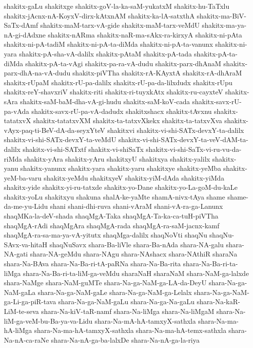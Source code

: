 {shakitx-gaLu
shakitxge
shakitx-goV-la-ka-saM-yukatxM
shakitx-hu-TaTxlu
shakitx-jAcnx-nA-KoyxV-dirx-kAtxnAM
shakitx-ka-lA-satxthA
shakitx-ma-BiV-SaTx-dAmf
shakitx-maM-tarx-vA-gide
shakitx-maM-tarx-veMdU
shakitx-ma-ya-nA-gi-dAdxne
shakitx-nARma
shakitx-naR-ma-sAkx-ra-kirxyA
shakitx-ni-pAta
shakitx-ni-pA-tadiM
shakitx-ni-pA-ta-diMda
shakitx-ni-pA-ta-vanunx
shakitx-ni-yara
shakitx-pA-sha-vA-dalilx
shakitx-pAtaM
shakitx-pA-tada
shakitx-pA-ta-diMda
shakitx-pA-ta-vAgi
shakitx-pa-ra-vA-dudu
shakitx-parx-dhAnaM
shakitx-parx-dhA-na-vA-dudu
shakitx-piVTha
shakitx-rA-KAyxtA
shakitx-rA-dhAraM
shakitx-rUpaM
shakitx-rU-pa-dalilx
shakitx-rU-pa-da-lilxdudx
shakitx-rUpu
shakitx-reY-shavxriV
shakitx-riti
shakitx-ri-tuyxkAtx
shakitx-ru-cayxteV
shakitx-sAra
shakitx-saM-baM-dha-vA-gi-hudu
shakitx-saM-koV-cada
shakitx-savx-rU-pa-vAda
shakitx-savx-rU-pa-vA-dadudx
shakitxshacx
shakitx-tAvxnu
shakitx-tatatxvX
shakitx-tatatxvXM
shakitx-ta-tatxvXkekx
shakitx-ta-tatxvXva
shakitx-vAyx-paq-ti-BeV-dA-da-seyxYteV
shakitxvi
shakitx-vi-shi-SATx-devxY-ta-dalilx
shakitx-vi-shi-SATx-devxY-ta-veMdU
shakitx-vi-shi-SATx-devxY-ta-veV-dAM-ta-dalilx
shakitx-vi-shi-SATxtf
shakitx-vi-shiSaTx
shakitx-vi-shi-SaTx-vi-ru-vu-da-riMda
shakitx-yAra
shakitx-yAru
shakitxyU
shakitxya
shakitx-yalilx
shakitx-yanu
shakitx-yanunx
shakitx-yara
shakitx-yaru
shakitxye
shakitx-yeMba
shakitx-yeM-ba-varu
shakitx-yeMdu
shakitxyeV
shakitx-yiM-dAda
shakitx-yiMda
shakitx-yide
shakitx-yi-ru-tatxde
shakitx-yo-Dane
shakitx-yo-La-goM-du-kaLe
shakitx-yoLu
shakitxyu
shakuna
shalA-ke-yaMte
shamA-nivx-tAya
shame
shame-da-me-yu-Lidu
shani
shani-dhi-ruva
shani-vAraM
shani-vA-ra-ga-Lanunx
shaqMKa-la-deV-shada
shaqMgA-Taka
shaqMgA-Ta-ka-ca-tuH-piVTha
shaqMgA-rAdi
shaqMgAra
shaqMgA-rada
shaqMgA-ra-saM-jacnx-kamf
shaqMgA-ra-sa-ma-ya-vA-yitutx
shaqMga-dalilx
shaqNoVti
shaqNu
shaqNu-SAvx-va-hitaH
shaqNuSavx
shara-Ba-liVle
shara-Ba-nAda
shara-NA-galu
shara-NA-gati
shara-NA-geMdu
shara-NAgu
shara-NAshacx
shara-NAthiR
sharaNa
shara-Na-BAva
shara-Na-Ba-ri-tA-paRNa
shara-Na-Ba-rita
shara-Na-Ba-ri-ta-liMga
shara-Na-Ba-ri-ta-liM-ga-veMdu
sharaNaH
sharaNaM
shara-NaM-ga-lalxde
shara-NaMge
shara-NaM-guMTe
shara-Na-ga-NaM-ga-LA-da-DeyU
shara-Na-ga-NaM-gaLa
shara-Na-ga-NaM-gaLe
shara-Na-ga-NaM-ga-Lelalx
shara-Na-ga-NaM-ga-Li-ga-piR-tava
shara-Na-ga-NaM-gaLu
shara-Na-ga-Na-gaLu
shara-Na-kaR-LiM-te-seva
shara-Na-kiV-taR-namf
shara-Na-liMga
shara-Na-liMgaM
shara-Na-liM-ga-veM-bu-Ba-ya-va-Lidu
shara-Na-mA-hA-tamxyX-sathxla
shara-Na-ma-hA-liMga
shara-Na-ma-hA-tamxyX-sathxla
shara-Na-ma-hA-temx-sathxla
shara-Na-nA-ca-raNe
shara-Na-nA-ga-ba-lalxDe
shara-Na-nA-ga-la-riya
}
